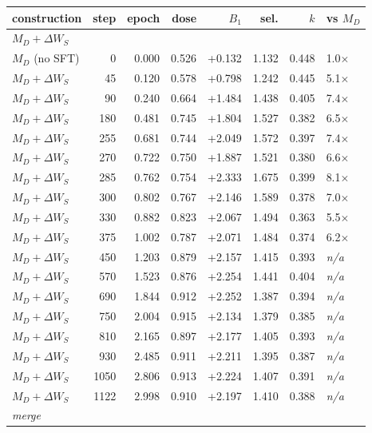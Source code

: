\begin{table}[h]
\centering
\small
\begin{tabular}{lrrrrrrl}
\toprule
construction & step & epoch & dose & $B_1$ & sel. & $k$ & vs $M_D$ \\
\midrule
\multicolumn{8}{l}{\emph{$M_D{+}\Delta W_S$}} \\
$M_D$ (no SFT) & 0 & 0.000 & 0.526 & +0.132 & 1.132 & 0.448 & 1.0$\times$ \\
$M_D{+}\Delta W_S$ & 45 & 0.120 & 0.578 & +0.798 & 1.242 & 0.445 & 5.1$\times$ \\
$M_D{+}\Delta W_S$ & 90 & 0.240 & 0.664 & +1.484 & 1.438 & 0.405 & 7.4$\times$ \\
$M_D{+}\Delta W_S$ & 180 & 0.481 & 0.745 & +1.804 & 1.527 & 0.382 & 6.5$\times$ \\
$M_D{+}\Delta W_S$ & 255 & 0.681 & 0.744 & +2.049 & 1.572 & 0.397 & 7.4$\times$ \\
$M_D{+}\Delta W_S$ & 270 & 0.722 & 0.750 & +1.887 & 1.521 & 0.380 & 6.6$\times$ \\
$M_D{+}\Delta W_S$ & 285 & 0.762 & 0.754 & +2.333 & 1.675 & 0.399 & 8.1$\times$ \\
$M_D{+}\Delta W_S$ & 300 & 0.802 & 0.767 & +2.146 & 1.589 & 0.378 & 7.0$\times$ \\
$M_D{+}\Delta W_S$ & 330 & 0.882 & 0.823 & +2.067 & 1.494 & 0.363 & 5.5$\times$ \\
$M_D{+}\Delta W_S$ & 375 & 1.002 & 0.787 & +2.071 & 1.484 & 0.374 & 6.2$\times$ \\
$M_D{+}\Delta W_S$ & 450 & 1.203 & 0.879 & +2.157 & 1.415 & 0.393 & \textit{n/a} \\
$M_D{+}\Delta W_S$ & 570 & 1.523 & 0.876 & +2.254 & 1.441 & 0.404 & \textit{n/a} \\
$M_D{+}\Delta W_S$ & 690 & 1.844 & 0.912 & +2.252 & 1.387 & 0.394 & \textit{n/a} \\
$M_D{+}\Delta W_S$ & 750 & 2.004 & 0.915 & +2.134 & 1.379 & 0.385 & \textit{n/a} \\
$M_D{+}\Delta W_S$ & 810 & 2.165 & 0.897 & +2.177 & 1.405 & 0.393 & \textit{n/a} \\
$M_D{+}\Delta W_S$ & 930 & 2.485 & 0.911 & +2.211 & 1.395 & 0.387 & \textit{n/a} \\
$M_D{+}\Delta W_S$ & 1050 & 2.806 & 0.913 & +2.224 & 1.407 & 0.391 & \textit{n/a} \\
$M_D{+}\Delta W_S$ & 1122 & 2.998 & 0.910 & +2.197 & 1.410 & 0.388 & \textit{n/a} \\
\midrule
\multicolumn{8}{l}{\emph{merge}} \\

\end{tabular}
\end{table}
